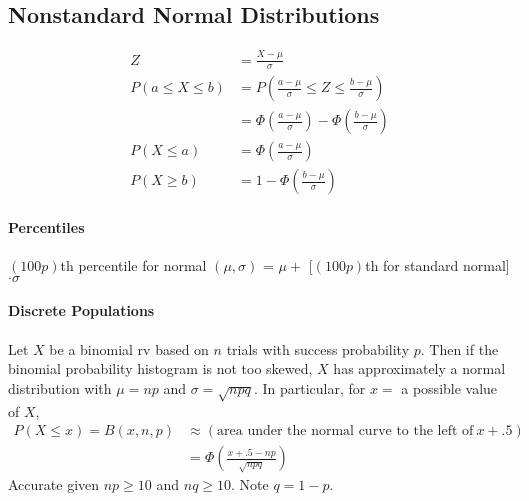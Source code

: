 \documentclass[paper=A4, pagesize, fontsize=7pt, DIV=calc]{scrartcl}
\begin{document}
\begin{minipage}[t]{.45\linewidth}
  \subsection{Nonstandard Normal Distributions}
  \begin{align*}
    Z &= \frac{X - \mu}{\sigma} \\
    P(a \le X \le b) &= P\left(\frac{a - \mu}{\sigma} \le Z \le \frac{b - \mu}{\sigma}\right) \\
    &= \Phi\left(\frac{a - \mu}{\sigma}\right) - \Phi\left(\frac{b - \mu}{\sigma}\right) \\
    P(X \le a) &= \Phi\left(\frac{a - \mu}{\sigma}\right) \\
    P(X \ge b) &= 1 - \Phi\left(\frac{b - \mu}{\sigma}\right)
  \end{align*}

  \paragraph{Percentiles}
  $(100p)$th percentile for normal $(\mu, \sigma)$ = $\mu + $ [$(100p)$th for standard normal] $\cdot \sigma$

  \paragraph{Discrete Populations}
  Let $X$ be a binomial rv based on $n$ trials with success probability $p$. Then if the binomial probability histogram is not too skewed, $X$ has approximately a normal distribution with $\mu = np$ and $\sigma = \sqrt{npq}$. In particular, for $x =$ a possible value of $X$,
  \begin{align*}
    P(X \le x) = B(x, n, p) &\approx (\text{area under the normal curve to the left of}\ x + .5) \\
    &= \Phi\left(\frac{x + .5 - np}{\sqrt{npq}}\right)
  \end{align*}
  Accurate given $np \ge 10$ and $nq \ge 10$. Note $q = 1 - p$.


\end{minipage}
\end{document}
